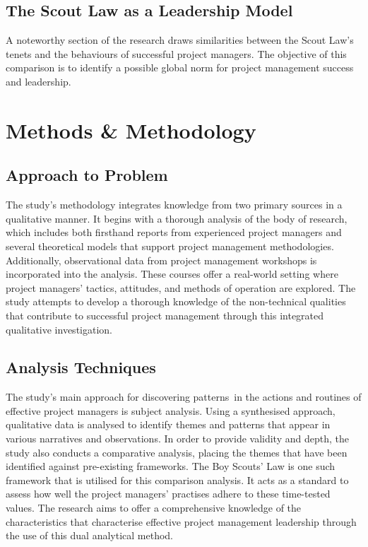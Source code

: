 \documentclass{article}
\begin{document}
\subsection{The Scout Law as a Leadership Model}
A noteworthy section of the research draws similarities between the Scout Law's tenets and the behaviours of successful project managers. The objective of this comparison is to identify a possible global norm for project management success and leadership.


\section{Methods \& Methodology}
\subsection{Approach to Problem}
The study's methodology integrates knowledge from two primary sources in a qualitative manner. It begins with a thorough analysis of the body of research, which includes both firsthand reports from experienced project managers and several theoretical models that support project management methodologies. Additionally, observational data from project management workshops is incorporated into the analysis. These courses offer a real-world setting where project managers' tactics, attitudes, and methods of operation are explored. The study attempts to develop a thorough knowledge of the non-technical qualities that contribute to successful project management through this integrated qualitative investigation.

\subsection{Analysis Techniques}
The study's main approach for discovering patterns in the actions and routines of effective project managers is subject analysis. Using a synthesised approach, qualitative data is analysed to identify themes and patterns that appear in various narratives and observations. In order to provide validity and depth, the study also conducts a comparative analysis, placing the themes that have been identified against pre-existing frameworks. The Boy Scouts' Law is one such framework that is utilised for this comparison analysis. It acts as a standard to assess how well the project managers' practises adhere to these time-tested values. The research aims to offer a comprehensive knowledge of the characteristics that characterise effective project management leadership through the use of this dual analytical method.
\end{document}
